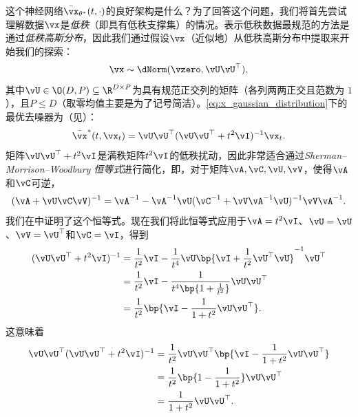 \documentclass[../../book-main_zh.tex]{subfiles}
\begin{document}
这个神经网络\(\bar{\vx}_{\theta^{\ast}}(t, \cdot)\)的良好架构是什么？为了回答这个问题，我们将首先尝试理解数据\(\vx\)是\textit{低秩}（即具有低秩支撑集）的情况。表示低秩数据最规范的方法是通过\textit{低秩高斯分布}，因此我们通过假设\(\vx\)（近似地）从低秩高斯分布中提取来开始我们的探索：
\begin{equation}\label{eq:x_gaussian_distribution}
    \vx \sim \dNorm(\vzero, \vU\vU^{\top}),
\end{equation}
其中\(\vU \in \O(D, P)\subseteq\R^{D\times P}\)为具有规范正交列的矩阵（各列两两正交且范数为 \(1\)），且\(P \leq D\)（取零均值主要是为了记号简洁）。\eqref{eq:x_gaussian_distribution}下的最优去噪器为（见）：
\begin{equation}\label{eq:optimal denoiser}
    \bar{\vx}^{\ast}(t, \vx_{t}) = \vU\vU^{\top}(\vU\vU^{\top} +
    t^{2}\vI)^{-1}\vx_{t}.
\end{equation}
矩阵\(\vU\vU^{\top} + t^{2}\vI\)是满秩矩阵\(t^{2}\vI\)的低秩扰动，因此非常适合通过\textit{Sherman--Morrison--Woodbury 恒等式}进行简化，即，对于矩阵\(\vA, \vC, \vU, \vV\)，使得\(\vA\)和\(\vC\)可逆，
\begin{equation}\label{eq:sherman_morrison_woodbury}
    (\vA + \vU\vC\vV)^{-1} = \vA^{-1} - \vA^{-1}\vU(\vC^{-1} +
    \vV\vA^{-1}\vU)^{-1}\vV\vA^{-1}.
\end{equation}
我们在中证明了这个恒等式。现在我们将此恒等式应用于\(\vA = t^{2}\vI\)、\(\vU = \vU\)、\(\vV = \vU^{\top}\)和\(\vC = \vI\)，得到
\begin{align}
    (\vU\vU^{\top} + t^{2}\vI)^{-1}
    &= \frac{1}{t^{2}}\vI - \frac{1}{t^{4}}\vU\bp{\vI +
    \frac{1}{t^{2}}\vU^{\top}\vU}^{-1}\vU^{\top} \\
    &= \frac{1}{t^{2}}\vI - \frac{1}{t^{4}\bp{1 +
    \frac{1}{t^{2}}}}\vU\vU^{\top} \\
    &= \frac{1}{t^{2}}\bp{\vI - \frac{1}{1 +
    t^{2}}\vU\vU^{\top}}.\label{eq:gaussian_lowrank_inverse_perturbation_simplified}
\end{align}
这意味着
\begin{align}
    \vU\vU^{\top}(\vU\vU^{\top} + t^{2}\vI)^{-1}
    &= \frac{1}{t^{2}}\vU\vU^{\top}\bp{\vI - \frac{1}{1 +
    t^{2}}\vU\vU^{\top}} \\
    &= \frac{1}{t^{2}}\bp{1 - \frac{1}{1 + t^{2}}}\vU\vU^{\top} \\
    &= \frac{1}{1 +
    t^{2}}\vU\vU^{\top}.\label{eq:gaussian_lowrank_denoiser_simplified}
\end{align}
\end{document}
